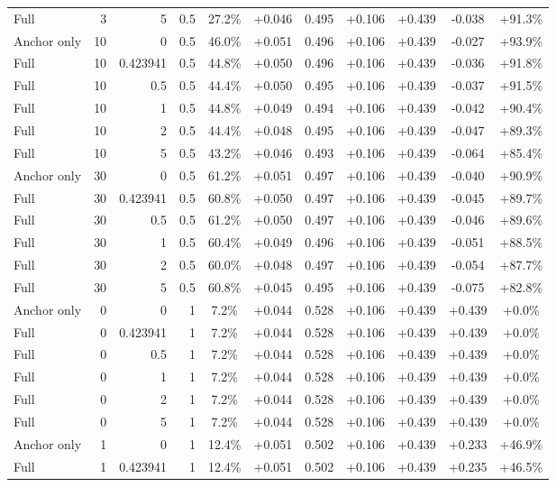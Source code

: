 \begin{table}[htbp]
\begin{tabular}{lrrrccccccc}
Full & 3 & 5 & 0.5 & 27.2\% & +0.046 & 0.495 & +0.106 & +0.439 & -0.038 & +91.3\% \\
Anchor only & 10 & 0 & 0.5 & 46.0\% & +0.051 & 0.496 & +0.106 & +0.439 & -0.027 & +93.9\% \\
Full & 10 & 0.423941 & 0.5 & 44.8\% & +0.050 & 0.496 & +0.106 & +0.439 & -0.036 & +91.8\% \\
Full & 10 & 0.5 & 0.5 & 44.4\% & +0.050 & 0.495 & +0.106 & +0.439 & -0.037 & +91.5\% \\
Full & 10 & 1 & 0.5 & 44.8\% & +0.049 & 0.494 & +0.106 & +0.439 & -0.042 & +90.4\% \\
Full & 10 & 2 & 0.5 & 44.4\% & +0.048 & 0.495 & +0.106 & +0.439 & -0.047 & +89.3\% \\
Full & 10 & 5 & 0.5 & 43.2\% & +0.046 & 0.493 & +0.106 & +0.439 & -0.064 & +85.4\% \\
Anchor only & 30 & 0 & 0.5 & 61.2\% & +0.051 & 0.497 & +0.106 & +0.439 & -0.040 & +90.9\% \\
Full & 30 & 0.423941 & 0.5 & 60.8\% & +0.050 & 0.497 & +0.106 & +0.439 & -0.045 & +89.7\% \\
Full & 30 & 0.5 & 0.5 & 61.2\% & +0.050 & 0.497 & +0.106 & +0.439 & -0.046 & +89.6\% \\
Full & 30 & 1 & 0.5 & 60.4\% & +0.049 & 0.496 & +0.106 & +0.439 & -0.051 & +88.5\% \\
Full & 30 & 2 & 0.5 & 60.0\% & +0.048 & 0.497 & +0.106 & +0.439 & -0.054 & +87.7\% \\
Full & 30 & 5 & 0.5 & 60.8\% & +0.045 & 0.495 & +0.106 & +0.439 & -0.075 & +82.8\% \\
Anchor only & 0 & 0 & 1 & 7.2\% & +0.044 & 0.528 & +0.106 & +0.439 & +0.439 & +0.0\% \\
Full & 0 & 0.423941 & 1 & 7.2\% & +0.044 & 0.528 & +0.106 & +0.439 & +0.439 & +0.0\% \\
Full & 0 & 0.5 & 1 & 7.2\% & +0.044 & 0.528 & +0.106 & +0.439 & +0.439 & +0.0\% \\
Full & 0 & 1 & 1 & 7.2\% & +0.044 & 0.528 & +0.106 & +0.439 & +0.439 & +0.0\% \\
Full & 0 & 2 & 1 & 7.2\% & +0.044 & 0.528 & +0.106 & +0.439 & +0.439 & +0.0\% \\
Full & 0 & 5 & 1 & 7.2\% & +0.044 & 0.528 & +0.106 & +0.439 & +0.439 & +0.0\% \\
Anchor only & 1 & 0 & 1 & 12.4\% & +0.051 & 0.502 & +0.106 & +0.439 & +0.233 & +46.9\% \\
Full & 1 & 0.423941 & 1 & 12.4\% & +0.051 & 0.502 & +0.106 & +0.439 & +0.235 & +46.5\% \\

\end{tabular}
\end{table}
